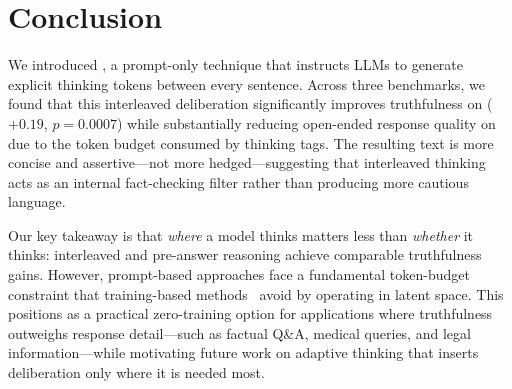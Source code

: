 \section{Conclusion}
\label{sec:conclusion}

We introduced \sentthink, a prompt-only technique that instructs LLMs to generate explicit thinking tokens between every sentence. Across three benchmarks, we found that this interleaved deliberation significantly improves truthfulness on \tqa ($+0.19$, $p{=}0.0007$) while substantially reducing open-ended response quality on \mtbench due to the token budget consumed by thinking tags. The resulting text is more concise and assertive---not more hedged---suggesting that interleaved thinking acts as an internal fact-checking filter rather than producing more cautious language.

Our key takeaway is that \emph{where} a model thinks matters less than \emph{whether} it thinks: interleaved and pre-answer reasoning achieve comparable truthfulness gains. However, prompt-based approaches face a fundamental token-budget constraint that training-based methods~\cite{goyal2023think,zelikman2024quietstar} avoid by operating in latent space. This positions \sentthink as a practical zero-training option for applications where truthfulness outweighs response detail---such as factual Q\&A, medical queries, and legal information---while motivating future work on adaptive thinking that inserts deliberation only where it is needed most.
